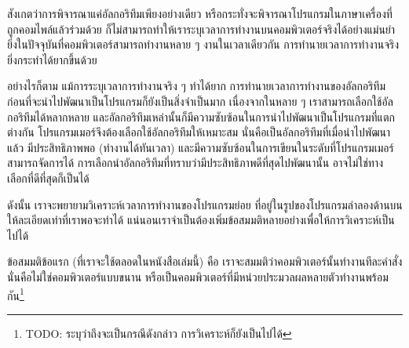 สังเกต{\wbr}ว่า{\wbr}การ{\wbr}พิจารณา{\wbr}แค่{\wbr}อัลกอริทึม{\wbr}เพียง{\wbr}อย่าง{\wbr}เดียว{\wbr}
หรือ{\wbr}กระทั่ง{\wbr}จะ{\wbr}พิจารณา{\wbr}โปรแกรม{\wbr}ใน{\wbr}ภาษา{\wbr}เครื่อง{\wbr}ที่{\wbr}ถูก{\wbr}คอมไพล์{\wbr}แล้ว{\wbr}ร่วม{\wbr}ด้วย{\wbr}
ก็{\wbr}ไม่{\wbr}สามารถ{\wbr}ทำให้{\wbr}เรา{\wbr}ระบุ{\wbr}เวลา{\wbr}การ{\wbr}ทำงาน{\wbr}บน{\wbr}คอมพิวเตอร์{\wbr}จริง{\wbr}ได้{\wbr}อย่าง{\wbr}แม่นยำ{\wbr}
ยิ่ง{\wbr}ใน{\wbr}ปัจจุบัน{\wbr}ที่{\wbr}คอมพิวเตอร์{\wbr}สามารถ{\wbr}ทำงาน{\wbr}หลาย ๆ งาน{\wbr}ใน{\wbr}เวลา{\wbr}เดียวกัน{\wbr}
การ{\wbr}ทำนาย{\wbr}เวลา{\wbr}การ{\wbr}ทำงาน{\wbr}จริง{\wbr}ยิ่ง{\wbr}กระทำ{\wbr}ได้{\wbr}ยาก{\wbr}ขึ้น{\wbr}ด้วย{\wbr}

อย่างไร{\wbr}ก็{\wbr}ตาม แม้{\wbr}การ{\wbr}ระบุ{\wbr}เวลา{\wbr}การ{\wbr}ทำงาน{\wbr}จริง ๆ ทำ{\wbr}ได้{\wbr}ยาก{\wbr}
การ{\wbr}ทำนาย{\wbr}เวลา{\wbr}การ{\wbr}ทำงาน{\wbr}ของ{\wbr}อัลกอริทึม{\wbr}ก่อน{\wbr}ที่{\wbr}จะ{\wbr}นำ{\wbr}ไป{\wbr}พัฒนา{\wbr}เป็น{\wbr}โปรแกรม{\wbr}ก็{\wbr}ยัง{\wbr}เป็น{\wbr}สิ่ง{\wbr}จำเป็น{\wbr}มาก{\wbr}
เนื่อง{\wbr}จาก{\wbr}ใน{\wbr}หลาย ๆ เรา{\wbr}สามารถ{\wbr}เลือก{\wbr}ใช้{\wbr}อัลกอริทึม{\wbr}ได้{\wbr}หลากหลาย{\wbr}
และ{\wbr}อัลกอริทึม{\wbr}เหล่า{\wbr}นั้น{\wbr}ก็{\wbr}มี{\wbr}ความ{\wbr}ซับซ้อน{\wbr}ใน{\wbr}การ{\wbr}นำ{\wbr}ไป{\wbr}พัฒนา{\wbr}เป็น{\wbr}โปรแกรม{\wbr}ที่{\wbr}แตก{\wbr}ต่าง{\wbr}กัน{\wbr}
โปรแกรมเมอร์{\wbr}จึง{\wbr}ต้อง{\wbr}เลือก{\wbr}ใช้{\wbr}อัลกอริทึม{\wbr}ให้{\wbr}เหมาะสม นั่น{\wbr}คือ{\wbr}เป็น{\wbr}อัลกอริทึม{\wbr}ที่{\wbr}เมื่อ{\wbr}นำ{\wbr}ไป{\wbr}พัฒนา{\wbr}แล้ว{\wbr}
มี{\wbr}ประสิทธิภาพ{\wbr}พอ (ทำงาน{\wbr}ได้{\wbr}ทัน{\wbr}เวลา)
และ{\wbr}มี{\wbr}ความ{\wbr}ซับซ้อน{\wbr}ใน{\wbr}การ{\wbr}เขียน{\wbr}ใน{\wbr}ระดับ{\wbr}ที่{\wbr}โปรแกรมเมอร์{\wbr}สามารถ{\wbr}จัดการ{\wbr}ได้{\wbr}
การ{\wbr}เลือก{\wbr}นำ{\wbr}อัลกอริทึม{\wbr}ที่{\wbr}ทราบ{\wbr}ว่า{\wbr}มี{\wbr}ประสิทธิภาพ{\wbr}ดี{\wbr}ที่สุด{\wbr}ไป{\wbr}พัฒนา{\wbr}นั้น{\wbr}
อาจ{\wbr}ไม่{\wbr}ใช่{\wbr}ทาง{\wbr}เลือก{\wbr}ที่{\wbr}ดี{\wbr}ที่สุด{\wbr}ก็{\wbr}เป็น{\wbr}ได้{\wbr}

ดังนั้น เรา{\wbr}จะ{\wbr}พยายาม{\wbr}วิเคราะห์{\wbr}เวลา{\wbr}การ{\wbr}ทำงาน{\wbr}ของ{\wbr}โปรแกรม{\wbr}ย่อย{\wbr}
ที่{\wbr}อยู่{\wbr}ใน{\wbr}รูป{\wbr}ของ{\wbr}โปรแกรม{\wbr}ลำลอง{\wbr}ด้าน{\wbr}บน ให้{\wbr}ละเอียด{\wbr}เท่า{\wbr}ที่{\wbr}เรา{\wbr}พอ{\wbr}จะ{\wbr}ทำ{\wbr}ได้{\wbr}
แน่นอน{\wbr}เรา{\wbr}จำเป็น{\wbr}ต้อง{\wbr}เพิ่ม{\wbr}ข้อ{\wbr}สมมติ{\wbr}หลาย{\wbr}อย่าง{\wbr}เพื่อ{\wbr}ให้การ{\wbr}วิเคราะห์{\wbr}เป็น{\wbr}ไป{\wbr}ได้{\wbr}

ข้อ{\wbr}สมมติ{\wbr}ข้อ{\wbr}แรก (ที่{\wbr}เรา{\wbr}จะ{\wbr}ใช้{\wbr}ตลอด{\wbr}ใน{\wbr}หนังสือ{\wbr}เล่ม{\wbr}นี้) คือ{\wbr}
เรา{\wbr}จะ{\wbr}สมมติ{\wbr}ว่า{\wbr}คอมพิวเตอร์{\wbr}นั้น{\wbr}ทำงาน{\wbr}ที{\wbr}ละ{\wbr}คำ{\wbr}สั่ง นั่น{\wbr}คือ{\wbr}ไม่{\wbr}ใช่{\wbr}คอมพิวเตอร์{\wbr}แบบ{\wbr}ขนาน{\wbr}
หรือ{\wbr}เป็น{\wbr}คอมพิวเตอร์{\wbr}ที่{\wbr}มี{\wbr}หน่วย{\wbr}ประมวล{\wbr}ผล{\wbr}หลาย{\wbr}ตัว{\wbr}ทำงาน{\wbr}พร้อม{\wbr}กัน\footnote{TODO:
  ระบุ{\wbr}ว่า{\wbr}ถึง{\wbr}จะ{\wbr}เป็น{\wbr}กรณี{\wbr}ดัง{\wbr}กล่าว การ{\wbr}วิเคราะห์{\wbr}ก็{\wbr}ยัง{\wbr}เป็น{\wbr}ไป{\wbr}ได้}

